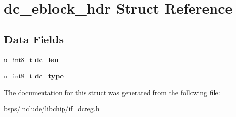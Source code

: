 \hypertarget{structdc__eblock__hdr}{}\section{dc\+\_\+eblock\+\_\+hdr Struct Reference}
\label{structdc__eblock__hdr}
\subsection*{Data Fields}
\begin{DoxyCompactItemize}
\item 
\mbox{\label{structdc__eblock__hdr_ae641994555bc35e74928ff0fdeb131aa}} 
u\+\_\+int8\+\_\+t {\bfseries dc\+\_\+len}
\item 
\mbox{\label{structdc__eblock__hdr_a79c8678a53e8b6ea988792943a869e17}} 
u\+\_\+int8\+\_\+t {\bfseries dc\+\_\+type}
\end{DoxyCompactItemize}


The documentation for this struct was generated from the following file\+:\begin{DoxyCompactItemize}
\item 
bsps/include/libchip/if\+\_\+dcreg.\+h\end{DoxyCompactItemize}
